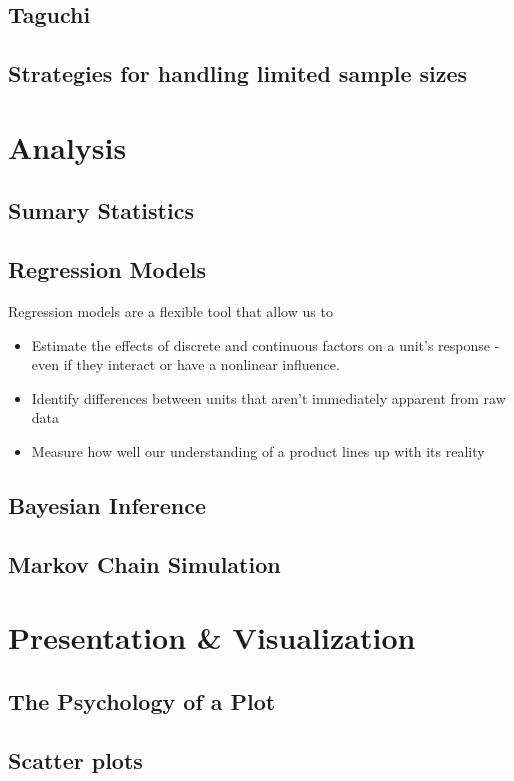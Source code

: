 \documentclass[11pt,a4paper,article]{memoir} %
\begin{document}
\subsection{Taguchi}
\subsection{Strategies for handling limited sample sizes}

\section{Analysis}
\subsection{Sumary Statistics}
\subsection{Regression Models}
Regression models are a flexible tool that allow us to
\begin{itemize}
\item Estimate the effects of discrete and continuous factors on a unit's response - even if they interact or have a nonlinear influence.
\item Identify differences between units that aren't immediately apparent from raw data
\item Measure how well our understanding of a product lines up with its reality
\end{itemize}
\subsection{Bayesian Inference}
\subsection{Markov Chain Simulation}

\section{Presentation \& Visualization}
\subsection{The Psychology of a Plot}
\subsection{Scatter plots}
\end{document}
